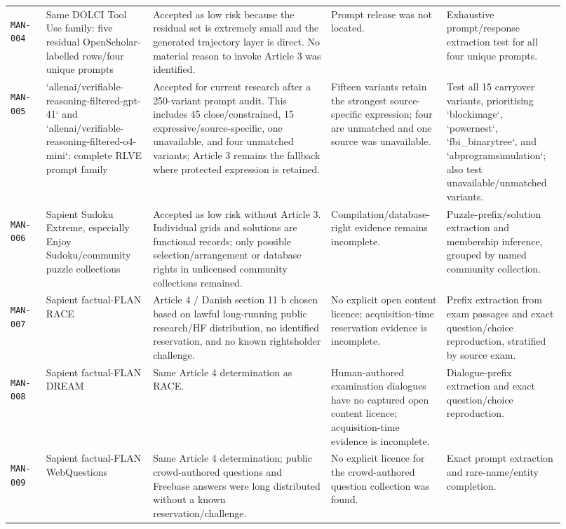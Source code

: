 \documentclass[9pt,a4paper]{article}
\newcommand{\manid}[1]{\hypertarget{manual:#1}{\texttt{#1}}}
\begin{document}
\begin{landscape}
\begin{longtable}{@{}L{0.06\linewidth}L{0.18\linewidth}L{0.30\linewidth}L{0.18\linewidth}L{0.20\linewidth}@{}}
\manid{MAN-004} & Same DOLCI Tool Use family: five residual OpenScholar-labelled rows/four unique prompts & Accepted as low risk because the residual set is extremely small and the generated trajectory layer is direct. No material reason to invoke Article 3 was identified. & Prompt release was not located. & Exhaustive prompt/response extraction test for all four unique prompts. \\
\manid{MAN-005} & `allenai/verifiable-reasoning-filtered-gpt-41` and `allenai/verifiable-reasoning-filtered-o4-mini`: complete RLVE prompt family & Accepted for current research after a 250-variant prompt audit. This includes 45 close/constrained, 15 expressive/source-specific, one unavailable, and four unmatched variants; Article 3 remains the fallback where protected expression is retained. & Fifteen variants retain the strongest source-specific expression; four are unmatched and one source was unavailable. & Test all 15 carryover variants, prioritising `blockimage`, `powernest`, `fbi\_binarytree`, and `abprogramsimulation`; also test unavailable/unmatched variants. \\
\manid{MAN-006} & Sapient Sudoku Extreme, especially Enjoy Sudoku/community puzzle collections & Accepted as low risk without Article 3. Individual grids and solutions are functional records; only possible selection/arrangement or database rights in unlicensed community collections remained. & Compilation/database-right evidence remains incomplete. & Puzzle-prefix/solution extraction and membership inference, grouped by named community collection. \\
\manid{MAN-007} & Sapient factual-FLAN RACE & Article 4 / Danish section 11 b chosen based on lawful long-running public research/HF distribution, no identified reservation, and no known rightsholder challenge. & No explicit open content licence; acquisition-time reservation evidence is incomplete. & Prefix extraction from exam passages and exact question/choice reproduction, stratified by source exam. \\
\manid{MAN-008} & Sapient factual-FLAN DREAM & Same Article 4 determination as RACE. & Human-authored examination dialogues have no captured open content licence; acquisition-time evidence is incomplete. & Dialogue-prefix extraction and exact question/choice reproduction. \\
\manid{MAN-009} & Sapient factual-FLAN WebQuestions & Same Article 4 determination; public crowd-authored questions and Freebase answers were long distributed without a known reservation/challenge. & No explicit licence for the crowd-authored question collection was found. & Exact prompt extraction and rare-name/entity completion. \\

\end{longtable}
\end{landscape}
\end{document}
